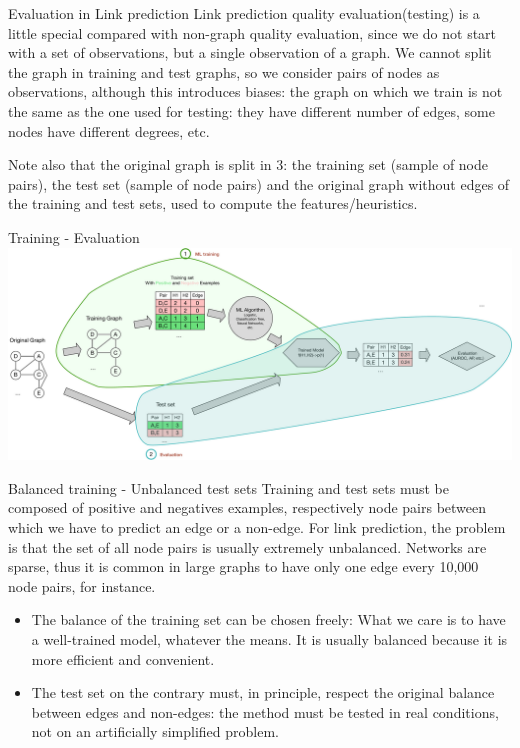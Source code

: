 \documentclass[a4paper,11pt]{book}
\begin{document}
\begin{textbox}{Evaluation in Link prediction}
Link prediction quality evaluation(testing) is a little special compared with non-graph quality evaluation, since we do not start with a set of observations, but a single observation of a graph. We cannot split the graph in training and test graphs, so we consider pairs of nodes as observations, although this introduces biases: the graph on which we train is not the same as the one used for testing: they have different number of edges, some nodes have different degrees, etc.

Note also that the original graph is split in 3: the training set (sample of node pairs), the test set (sample of node pairs) and the original graph without edges of the training and test sets, used to compute the features/heuristics. 
\end{textbox}

\begin{textbox}{Training - Evaluation}
\includegraphics[width=\textwidth]{pics/train-test.pdf}
\end{textbox}

\begin{textbox}{Balanced training - Unbalanced test sets}
Training and test sets must be composed of positive and negatives examples, respectively node pairs between which we have to predict an edge or a non-edge.
For link prediction, the problem is that the set of all node pairs is usually extremely unbalanced. Networks are sparse, thus it is common in large graphs to have only one edge every 10,000 node pairs, for instance.

\begin{itemize}
    \item The balance of the training set can be chosen freely: What we care is to have a well-trained model, whatever the means. It is usually balanced because it is more efficient and convenient.
    \item The test set on the contrary must, in principle, respect the original balance between edges and non-edges: the method must be tested in real conditions, not on an artificially simplified problem. 
\end{itemize}

\end{textbox}
\end{document}
